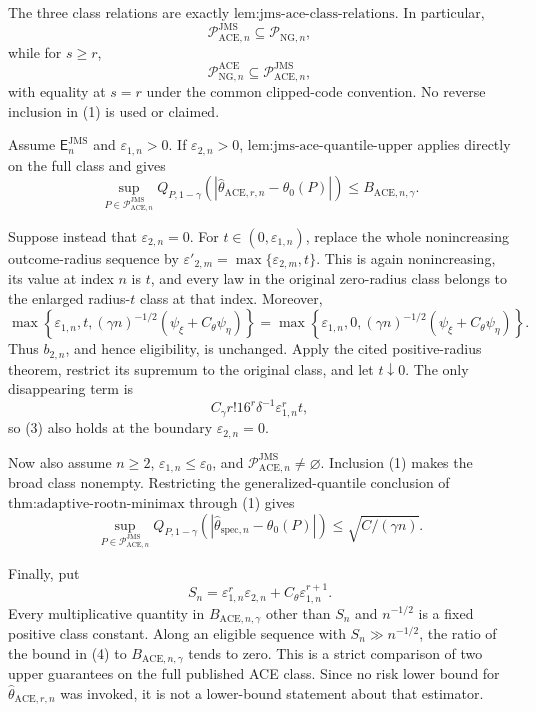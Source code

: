 The three class relations are exactly
\(\text{lem:jms-ace-class-relations}\).  In particular,
\[
 \mathcal P_{\mathrm{ACE},n}^{\mathrm{JMS}}
 \subseteq\mathcal P_{\mathrm{NG},n},                             \tag{1}
\]
while for \(s\ge r\),
\[
 \mathcal P_{\mathrm{NG},n}^{\mathrm{ACE}}
 \subseteq\mathcal P_{\mathrm{ACE},n}^{\mathrm{JMS}},            \tag{2}
\]
with equality at \(s=r\) under the common clipped-code convention.  No
reverse inclusion in (1) is used or claimed.

Assume \(\mathsf E_n^{\mathrm{JMS}}\) and
\(\varepsilon_{1,n}>0\).  If \(\varepsilon_{2,n}>0\),
\(\text{lem:jms-ace-quantile-upper}\) applies directly on the full class and
gives
\[
 \sup_{P\in\mathcal P_{\mathrm{ACE},n}^{\mathrm{JMS}}}
 Q_{P,1-\gamma}(|\widehat\theta_{\mathrm{ACE},r,n}-\theta_0(P)|)
 \le B_{\mathrm{ACE},n,\gamma}.                                  \tag{3}
\]

Suppose instead that \(\varepsilon_{2,n}=0\).  For
\(t\in(0,\varepsilon_{1,n})\), replace the whole nonincreasing outcome-radius
sequence by \(\varepsilon'_{2,m}=\max\{\varepsilon_{2,m},t\}\).  This is
again nonincreasing, its value at index \(n\) is \(t\), and every law in the
original zero-radius class belongs to the enlarged radius-\(t\) class at
that index.  Moreover,
\[
 \max\!\left\{\varepsilon_{1,n},t,
  (\gamma n)^{-1/2}(\psi_{\xi}+C_{\theta}\psi_{\eta})\right\}
 =
 \max\!\left\{\varepsilon_{1,n},0,
  (\gamma n)^{-1/2}(\psi_{\xi}+C_{\theta}\psi_{\eta})\right\}.
\]
Thus \(b_{2,n}\), and hence eligibility, is unchanged.  Apply the cited
positive-radius theorem, restrict its supremum to the original class, and
let \(t\downarrow0\).  The only disappearing term is
\[
 C_{\gamma}r!16^r\delta^{-1}\varepsilon_{1,n}^rt,
\]
so (3) also holds at the boundary \(\varepsilon_{2,n}=0\).

Now also assume \(n\ge2\),
\(\varepsilon_{1,n}\le\varepsilon_0\), and
\(\mathcal P_{\mathrm{ACE},n}^{\mathrm{JMS}}\ne\varnothing\).  Inclusion
(1) makes the broad class nonempty.  Restricting the generalized-quantile
conclusion of \(\text{thm:adaptive-rootn-minimax}\) through (1) gives
\[
 \sup_{P\in\mathcal P_{\mathrm{ACE},n}^{\mathrm{JMS}}}
 Q_{P,1-\gamma}(|\widehat\theta_{\mathrm{spec},n}-\theta_0(P)|)
 \le\sqrt{C/(\gamma n)}.                                         \tag{4}
\]

Finally, put
\[
 S_n=\varepsilon_{1,n}^r\varepsilon_{2,n}
     +C_{\theta}\varepsilon_{1,n}^{r+1}.
\]
Every multiplicative quantity in \(B_{\mathrm{ACE},n,\gamma}\) other than
\(S_n\) and \(n^{-1/2}\) is a fixed positive class constant.  Along an
eligible sequence with \(S_n\gg n^{-1/2}\), the ratio of the bound in (4)
to \(B_{\mathrm{ACE},n,\gamma}\) tends to zero.  This is a strict comparison
of two upper guarantees on the full published ACE class.  Since no risk
lower bound for \(\widehat\theta_{\mathrm{ACE},r,n}\) was invoked, it is not
a lower-bound statement about that estimator.